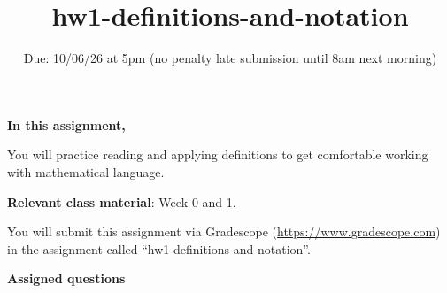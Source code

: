 \newpage

\title{hw1-definitions-and-notation}
\date{Due: 10/06/26 at 5pm (no penalty late submission until 8am next morning)}

\maketitle
\thispagestyle{fancy}


{\bf In this assignment,}

You will practice reading and
applying definitions to get comfortable working with mathematical language.

{\bf Relevant class material}: Week 0 and 1.

You will submit this assignment via Gradescope
(\href{https://www.gradescope.com}{https://www.gradescope.com}) 
in the assignment called ``hw1-definitions-and-notation''.

\instructions


{\bf Assigned questions}

